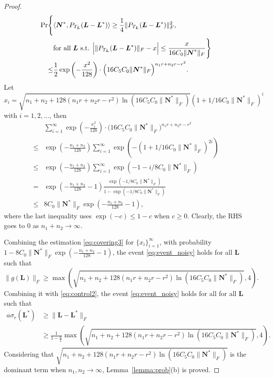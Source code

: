\documentclass[12pt]{article}
\newcommand{\bL}{\boldsymbol{L}}
\def\bN{\boldsymbol{N}}
\theoremstyle{plain}
\theoremstyle{definition}
\theoremstyle{plain}
\theoremstyle{plain}
\theoremstyle{remark}
\begin{document}
\begin{proof}
\begin{align}
\Pr\Biggl\{ & \langle\bN^{*},P_{T_{\bL}}(\bL-\bL^{*})\rangle\geq\frac{1}{4}\|P_{T_{\bL}}(\bL-\bL^{*})\|_{F}^{2},\nonumber\\
 & \text{for all \ensuremath{\bL} s.t. \ensuremath{\Big|\|P_{T_{\bL}}(\bL-\bL^{*})\|_{F}-x\Big|\leq\frac{x}{16C_{0}\|\bN^{*}\|_{F}}}}\Biggl\}\nonumber\\
\leq & \frac{1}{2}\exp\left(-\frac{x^{2}}{128}\right)\cdot\Big(16C_{5}C_{0}\|\bN^{*}\|_{F}\Big)^{n_{1}r+n_{2}r-r^{2}}.\label{eq:covering3}
\end{align}
Let $x_i=\sqrt{n_1+n_2+128(n_1r+n_2r-r^2)\ln(16C_5C_0\|\bN^*\|_F)} (1+1/16C_0\|\bN^*\|_F)^i$ with $i=1,2,...$, then
\begin{align}
 & \sum_{i=1}^{\infty}\exp\left(-\frac{x_{i}^{2}}{128}\right)\cdot\Big(16C_{5}C_{0}\|\bN^{*}\|_{F}\Big)^{n_{1}r+n_{2}r-r^{2}}\nonumber\\
\leq & \exp(-\frac{n_{1}+n_{2}}{128})\sum_{i=1}^{\infty}\exp(-{(1+1/16C_{0}\|\bN^{*}\|_{F})^{2i}})\nonumber\\
\leq & \exp(-\frac{n_{1}+n_{2}}{128})\sum_{i=1}^{\infty}\exp(-1-i/8C_{0}\|\bN^{*}\|_{F})\nonumber\\
= & \exp(-\frac{n_{1}+n_{2}}{128}-1)\frac{\exp(-1/8C_{0}\|\bN^{*}\|_{F})}{1-\exp(-1/8C_{0}\|\bN^{*}\|_{F})}\nonumber\\
\leq & 8C_{0}\|\bN^{*}\|_{F}\exp(-\frac{n_{1}+n_{2}}{128}-1),\label{eq:convering4}
\end{align}
where the last inequality uses $\exp(-c)\leq 1-c$ when $c\geq 0$. Clearly, the RHS goes to $0$ as $n_1+n_2\rightarrow\infty$.

Combining the estimation \eqref{eq:covering3} for $\{x_i\}_{i=1}^\infty$, with probability $1-8C_0\|\bN^*\|_F\exp(-\frac{n_1+n_2}{128}-1)$, the event \eqref{eq:event_noisy} holds for all $\bL$ such that \[\|g(\bL)\|_F\geq \max(\sqrt{n_1+n_2+128(n_1r+n_2r-r^2)\ln(16C_5C_0\|\bN^*\|_F)},4).\] Combining it with \eqref{eq:control2}, the event \eqref{eq:event_noisy} holds for all for all $\bL$ such that
\begin{align*}
a\sigma_{r}(\bL^{*}) & \geq\|\bL-\bL^{*}\|_{F}\\
 & \geq\frac{1}{1-\frac{a}{2}}\max(\sqrt{n_{1}+n_{2}+128(n_{1}r+n_{2}r-r^{2})\ln(16C_{5}C_{0}\|\bN^{*}\|_{F})},4).
\end{align*}
Considering that $\sqrt{n_1+n_2+128(n_1r+n_2r-r^2)\ln(16C_5C_0\|\bN^*\|_F)}$ is the dominant term when $n_1,n_2\rightarrow\infty$, Lemma~\ref{lemma:prob}(b) is proved.
\end{proof}
\end{document}
